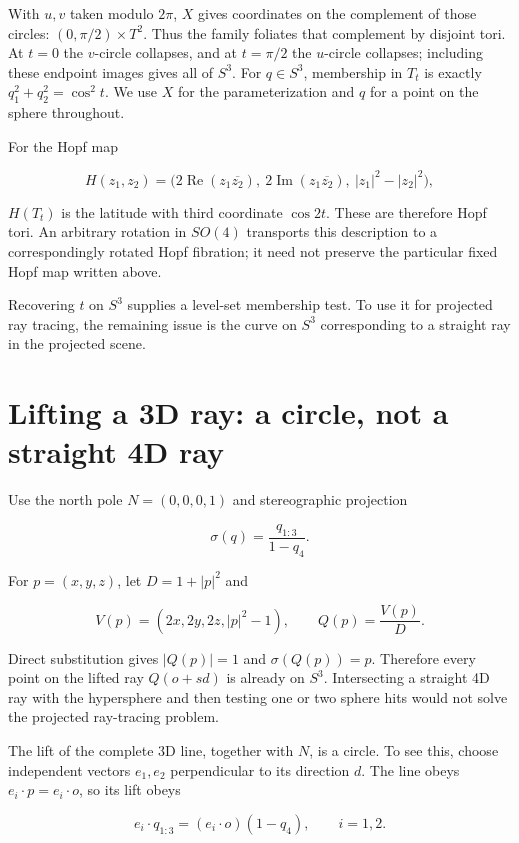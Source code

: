 \documentclass[11pt,a4paper]{article}
\begin{document}
With \(u,v\) taken modulo \(2\pi\), \(X\) gives coordinates on the
complement of those circles: \((0,\pi/2)\times T^2\). Thus the family
foliates that complement by disjoint tori. At \(t=0\) the \(v\)-circle
collapses, and at \(t=\pi/2\) the \(u\)-circle collapses; including
these endpoint images gives all of \(S^3\). For \(q\in S^3\), membership
in \(T_t\) is exactly \(q_1^2+q_2^2=\cos^2t\). We use \(X\) for the
parameterization and \(q\) for a point on the sphere throughout.

For the Hopf map

\[
H(z_1,z_2)=\bigl(2\operatorname{Re}(z_1\overline{z_2}),\ 2\operatorname{Im}(z_1\overline{z_2}),\ |z_1|^2-|z_2|^2\bigr),
\]

\(H(T_t)\) is the latitude with third coordinate \(\cos 2t\). These are
therefore Hopf tori. An arbitrary rotation in \(SO(4)\) transports this
description to a correspondingly rotated Hopf fibration; it need not
preserve the particular fixed Hopf map written above.

Recovering \(t\) on \(S^3\) supplies a level-set membership test. To use
it for projected ray tracing, the remaining issue is the curve on
\(S^3\) corresponding to a straight ray in the projected scene.

\section{Lifting a 3D ray: a circle, not a straight 4D
ray}\label{lifting-a-3d-ray-a-circle-not-a-straight-4d-ray}

Use the north pole \(N=(0,0,0,1)\) and stereographic projection

\[
\sigma(q)=\frac{q_{1:3}}{1-q_4}.
\]

For \(p=(x,y,z)\), let \(D=1+|p|^2\) and

\[
V(p)=(2x,2y,2z,|p|^2-1),\qquad Q(p)=\frac{V(p)}D.
\]

Direct substitution gives \(|Q(p)|=1\) and \(\sigma(Q(p))=p\). Therefore
every point on the lifted ray \(Q(o+s d)\) is already on \(S^3\).
Intersecting a straight 4D ray with the hypersphere and then testing one
or two sphere hits would not solve the projected ray-tracing problem.

The lift of the complete 3D line, together with \(N\), is a circle. To
see this, choose independent vectors \(e_1,e_2\) perpendicular to its
direction \(d\). The line obeys \(e_i\cdot p=e_i\cdot o\), so its lift
obeys

\[
e_i\cdot q_{1:3}=(e_i\cdot o)(1-q_4),\qquad i=1,2.
\]
\end{document}
